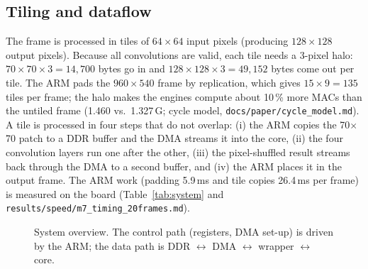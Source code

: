 \documentclass[conference]{IEEEtran}
\begin{document}
\subsection{Tiling and dataflow}
The frame is processed in tiles of $64\times64$ input pixels (producing $128\times128$ output pixels). Because all convolutions are valid, each tile needs a 3-pixel halo: $70\times70\times3 = 14{,}700$ bytes go in and
$128\times128\times3 = 49{,}152$ bytes come out per tile. The ARM pads the $960\times540$ frame by replication, which gives $15\times9 = 135$ tiles per frame; the halo makes the engines compute about 10\,\% more MACs than the untiled frame (1.460 vs.\ 1.327\,G; cycle model, \texttt{docs/\allowbreak{}paper/\allowbreak{}cycle\_model.md}).
A tile is processed in four steps that do not overlap: (i) the ARM copies the 70$\times$70 patch to a DDR buffer and the DMA streams it into the core, (ii) the four convolution layers run one after the other, (iii) the pixel-shuffled result streams back through the DMA to a second buffer, and (iv) the ARM places it in the output frame.
The ARM work (padding 5.9\,ms and tile copies 26.4\,ms per frame) is measured on the board (Table~\ref{tab:system} and \texttt{results/\allowbreak{}speed/\allowbreak{}m7\_timing\_20frames.md}).

\begin{figure}[t]
\centering
{}
\caption{System overview. The control path (registers, DMA set-up) is driven by the ARM; the data path is DDR $\leftrightarrow$ DMA $\leftrightarrow$ wrapper $\leftrightarrow$ core.}\label{fig:system}
\end{figure}
\end{document}
